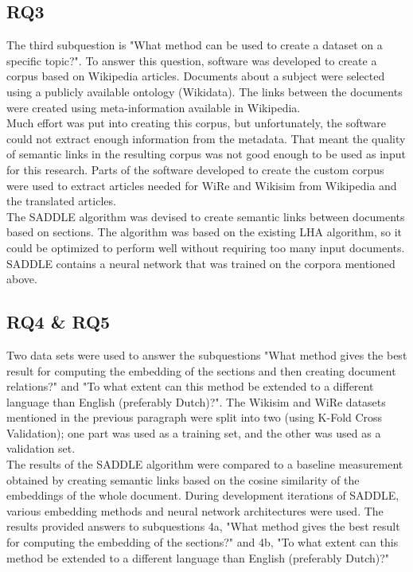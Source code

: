 \subsection{RQ3}
The third subquestion is "What method can be used to create a dataset on a specific topic?". To answer this question, software was developed to create a corpus based on Wikipedia articles. Documents about a subject were selected using a publicly available ontology (Wikidata). The links between the documents were created using meta-information available in Wikipedia.\\
Much effort was put into creating this corpus, but unfortunately, the software could not extract enough information from the metadata. That meant the quality of semantic links in the resulting corpus was not good enough to be used as input for this research. 
Parts of the software developed to create the custom corpus were used to extract articles needed for WiRe and Wikisim from Wikipedia and the translated articles. \\

The SADDLE algorithm was devised to create semantic links between documents based on sections. The algorithm was based on the existing LHA algorithm, so it could be optimized to perform well without requiring too many input documents. SADDLE contains a neural network that was trained on the corpora mentioned above. 

\subsection{RQ4 \& RQ5}
Two data sets were used to answer the subquestions "What method gives the best result for computing the embedding of the sections and then creating document relations?" and "To what extent can this method be extended to a different language than English (preferably Dutch)?". The Wikisim and WiRe datasets mentioned in the previous paragraph were split into two (using K-Fold Cross Validation); one part was used as a training set, and the other was used as a validation set. \\

The results of the SADDLE algorithm were compared to a baseline measurement obtained by creating semantic links based on the cosine similarity of the embeddings of the whole document. During development iterations of SADDLE, various embedding methods and neural network architectures were used. The results provided answers to subquestions 4a, "What method gives the best result for computing the embedding of the sections?" and 4b, "To what extent can this method be extended to a different language than English (preferably Dutch)?"\\

